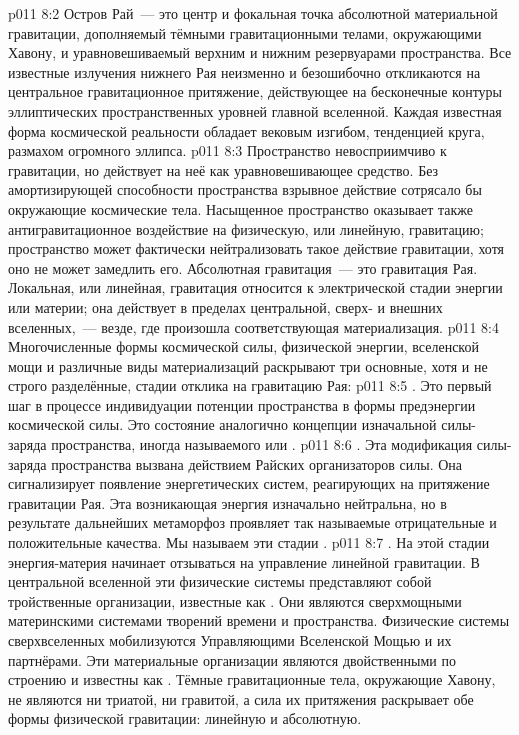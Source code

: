 \vs p011 8:2 Остров Рай~--- это центр и фокальная точка абсолютной материальной гравитации, дополняемый тёмными гравитационными телами, окружающими Хавону, и уравновешиваемый верхним и нижним резервуарами пространства. Все известные излучения нижнего Рая неизменно и безошибочно откликаются на центральное гравитационное притяжение, действующее на бесконечные контуры эллиптических пространственных уровней главной вселенной. Каждая известная форма космической реальности обладает вековым изгибом, тенденцией круга, размахом огромного эллипса.
\vs p011 8:3 Пространство невосприимчиво к гравитации, но действует на неё как уравновешивающее средство. Без амортизирующей способности пространства взрывное действие сотрясало бы окружающие космические тела. Насыщенное пространство оказывает также антигравитационное воздействие на физическую, или линейную, гравитацию; пространство может фактически нейтрализовать такое действие гравитации, хотя оно не может замедлить его. Абсолютная гравитация~--- это гравитация Рая. Локальная, или линейная, гравитация относится к электрической стадии энергии или материи; она действует в пределах центральной, сверх\hyp{} и внешних вселенных,~--- везде, где произошла соответствующая материализация.
\vs p011 8:4 \pc Многочисленные формы космической силы, физической энергии, вселенской мощи и различные виды материализаций раскрывают три основные, хотя и не строго разделённые, стадии отклика на гравитацию Рая:
\vs p011 8:5 . Это первый шаг в процессе индивидуации потенции пространства в формы предэнергии космической силы. Это состояние аналогично концепции изначальной силы\hyp{}заряда пространства, иногда называемого  или .
\vs p011 8:6 . Эта модификация силы\hyp{}заряда пространства вызвана действием Райских организаторов силы. Она сигнализирует появление энергетических систем, реагирующих на притяжение гравитации Рая. Эта возникающая энергия изначально нейтральна, но в результате дальнейших метаморфоз проявляет так называемые отрицательные и положительные качества. Мы называем эти стадии .
\vs p011 8:7 . На этой стадии энергия\hyp{}материя начинает отзываться на управление линейной гравитации. В центральной вселенной эти физические системы представляют собой тройственные организации, известные как . Они являются сверхмощными материнскими системами творений времени и пространства. Физические системы сверхвселенных мобилизуются Управляющими Вселенской Мощью и их партнёрами. Эти материальные организации являются двойственными по строению и известны как . Тёмные гравитационные тела, окружающие Хавону, не являются ни триатой, ни гравитой, а сила их притяжения раскрывает обе формы физической гравитации: линейную и абсолютную.
